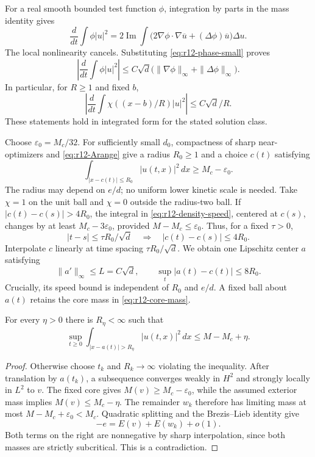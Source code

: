 For a real smooth bounded test function $\phi$, integration by parts in
the mass identity gives
\begin{equation}\label{eq:r12-density-id}
 \frac d{dt}\int\phi|u|^2
 =2\operatorname{Im}\int
 \bigl(2\nabla\phi\cdot\nabla\overline u+(\Delta\phi)\overline u\bigr)
             \Delta u.
\end{equation}
The local nonlinearity cancels. Substituting
\eqref{eq:r12-phase-small} proves
\[
 \left|\frac d{dt}\int\phi|u|^2\right|
 \le C\sqrt d\bigl(\|\nabla\phi\|_\infty+\|\Delta\phi\|_\infty\bigr).
\]
In particular, for $R\ge1$ and fixed $b$,
\begin{equation}\label{eq:r12-density-speed}
 \left|\frac d{dt}\int\chi((x-b)/R)|u|^2\right|
 \le C\sqrt d/R.
\end{equation}
These statements hold in integrated form for the stated solution class.

Choose $\varepsilon_0=M_c/32$. For sufficiently small $d_0$, compactness
of sharp near-optimizers and \eqref{eq:r12-Arange} give a radius
$R_0\ge1$ and a choice $c(t)$ satisfying
\begin{equation}\label{eq:r12-core-mass}
 \int_{|x-c(t)|\le R_0}|u(t,x)|^2\,dx\ge M_c-\varepsilon_0.
\end{equation}
The radius may depend on $e/d$; no uniform lower kinetic scale is needed.
Take $\chi=1$ on the unit ball and $\chi=0$ outside the radius-two ball.
If $|c(t)-c(s)|>4R_0$, the integral in
\eqref{eq:r12-density-speed}, centered at $c(s)$, changes by at least
$M_c-3\varepsilon_0$, provided $M-M_c\le\varepsilon_0$.
Thus, for a fixed $\tau>0$,
\[
 |t-s|\le\tau R_0/\sqrt d\quad\Longrightarrow\quad
 |c(t)-c(s)|\le4R_0.
\]
Interpolate $c$ linearly at time spacing $\tau R_0/\sqrt d$. We obtain
one Lipschitz center $a$ satisfying
\begin{equation}\label{eq:r12-center-speed}
 \|a'\|_\infty\le L=C\sqrt d,\qquad
 \sup_t|a(t)-c(t)|\le8R_0.
\end{equation}
Crucially, its speed bound is independent of $R_0$ and $e/d$.
A fixed ball about $a(t)$ retains the core mass in
\eqref{eq:r12-core-mass}.

\begin{lemma}
\label{lem:r12-tailmass}
For every $\eta>0$ there is $R_\eta<\infty$ such that
\begin{equation}\label{eq:r12-tailmass}
 \sup_{t\ge0}\int_{|x-a(t)|>R_\eta}|u(t,x)|^2\,dx
 \le M-M_c+\eta.
\end{equation}
\end{lemma}
\begin{proof}
Otherwise choose $t_k$ and $R_k\to\infty$ violating the inequality.
After translation by $a(t_k)$, a subsequence converges weakly in $H^2$
and strongly locally in $L^2$ to $v$. The fixed core gives
$M(v)\ge M_c-\varepsilon_0$, while the assumed exterior mass implies
$M(v)\le M_c-\eta$. The remainder $w_k$ therefore has limiting mass
at most $M-M_c+\varepsilon_0<M_c$. Quadratic splitting and the
Brezis--Lieb identity give
\[
 -e=E(v)+E(w_k)+o(1).
\]
Both terms on the right are nonnegative by sharp interpolation, since
both masses are strictly subcritical. This is a contradiction.
\end{proof}

